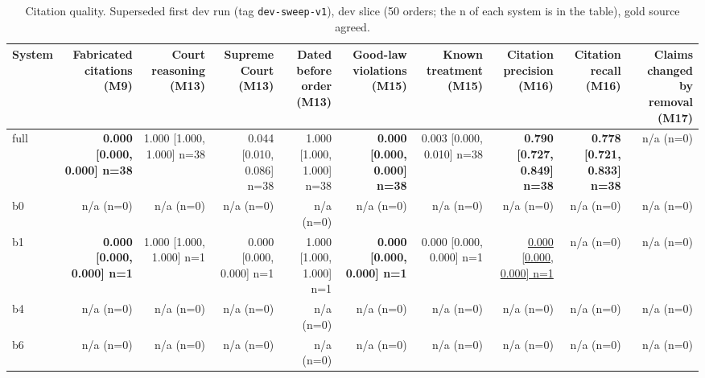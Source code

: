 \begin{table}[t]
\centering
\small
\caption{Citation quality. Superseded first dev run (tag \texttt{dev-sweep-v1}), dev slice (50 orders; the n of each system is in the table), gold source agreed.}
\label{tab:table_citations}
\begin{adjustbox}{max width=\textwidth}
\begin{tabular}{lrrrrrrrrr}
\toprule
System & Fabricated citations (M9) & Court reasoning (M13) & Supreme Court (M13) & Dated before order (M13) & Good-law violations (M15) & Known treatment (M15) & Citation precision (M16) & Citation recall (M16) & Claims changed by removal (M17) \\
\midrule
full & \textbf{0.000 [0.000, 0.000] n=38} & 1.000 [1.000, 1.000] n=38 & 0.044 [0.010, 0.086] n=38 & 1.000 [1.000, 1.000] n=38 & \textbf{0.000 [0.000, 0.000] n=38} & 0.003 [0.000, 0.010] n=38 & \textbf{0.790 [0.727, 0.849] n=38} & \textbf{0.778 [0.721, 0.833] n=38} & n/a (n=0) \\
b0 & n/a (n=0) & n/a (n=0) & n/a (n=0) & n/a (n=0) & n/a (n=0) & n/a (n=0) & n/a (n=0) & n/a (n=0) & n/a (n=0) \\
b1 & \textbf{0.000 [0.000, 0.000] n=1} & 1.000 [1.000, 1.000] n=1 & 0.000 [0.000, 0.000] n=1 & 1.000 [1.000, 1.000] n=1 & \textbf{0.000 [0.000, 0.000] n=1} & 0.000 [0.000, 0.000] n=1 & \underline{0.000 [0.000, 0.000] n=1} & n/a (n=0) & n/a (n=0) \\
b4 & n/a (n=0) & n/a (n=0) & n/a (n=0) & n/a (n=0) & n/a (n=0) & n/a (n=0) & n/a (n=0) & n/a (n=0) & n/a (n=0) \\
b6 & n/a (n=0) & n/a (n=0) & n/a (n=0) & n/a (n=0) & n/a (n=0) & n/a (n=0) & n/a (n=0) & n/a (n=0) & n/a (n=0) \\
\bottomrule
\end{tabular}
\end{adjustbox}
\end{table}
